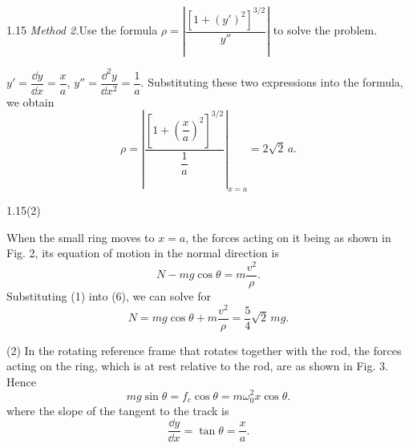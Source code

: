 \begin{solution}{1.15}
\textit{Method 2.}\quad Use the formula $\rho=\left|\dfrac{\left[1+(y')^2\right]^{3/2}}{y''}\right|$ to solve the problem.

$y'=\dfrac{\dd y}{\dd x}=\dfrac{x}{a}$, $y''=\dfrac{\dd^2y}{\dd x^2}=\dfrac{1}{a}$. Substituting these two expressions into the formula, we obtain
\[
\rho=\left|\frac{\left[1+\left(\dfrac{x}{a}\right)^2\right]^{3/2}}{\dfrac{1}{a}}\right|_{x=a}=2\sqrt{2}\,a.
\]

\begin{figbox}{1.15(2)}
\end{figbox}

When the small ring moves to $x=a$, the forces acting on it being as shown in Fig. 2, its equation of motion in the normal direction is
\begin{equation}
N-mg\cos\theta=m\frac{v^2}{\rho}. \tag{6}
\end{equation}
Substituting (1) into (6), we can solve for
\[
N=mg\cos\theta+m\frac{v^2}{\rho}=\frac{5}{4}\sqrt{2}\,mg.
\]

(2) In the rotating reference frame that rotates together with the rod, the forces acting on the ring, which is at rest relative to the rod, are as shown in Fig. 3. Hence
\begin{equation}
mg\sin\theta=f_c\cos\theta=m\omega_0^2x\cos\theta. \tag{7}
\end{equation}
where the slope of the tangent to the track is
\begin{equation}
\frac{\dd y}{\dd x}=\tan\theta=\frac{x}{a}. \tag{8}
\end{equation}


\end{solution}
